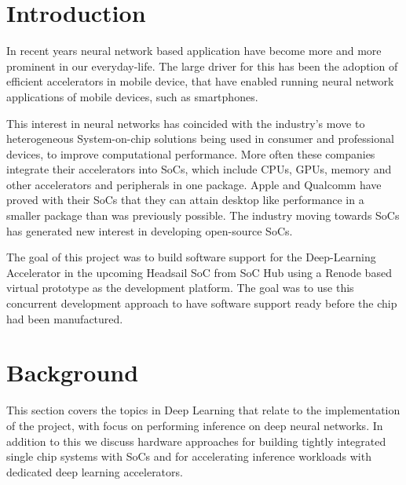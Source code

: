 \documentclass[12pt,a4paper,english
]{tunithesis}
\begin{document}
\thispagestyle{empty}
\listoffigures
\listoftables
\clearpage


\setcounter{tocdepth}{3}              %
\tableofcontents                      %

\if@twoside
\cleardoublepage
\fi


\renewcommand{\chaptername}{} %


\chapter{Introduction}
\label{ch:introduction}
\setcounter{page}{1} %

In recent years neural network based application have become more and more prominent in our everyday-life. The large driver for this has been the adoption of efficient accelerators in mobile device, that have enabled running neural network applications of mobile devices, such as smartphones.

This interest in neural networks has coincided with the industry's move to heterogeneous System-on-chip solutions being used in consumer and professional devices, to improve computational performance.
More often these companies integrate their accelerators into SoCs, which include CPUs, GPUs, memory and other accelerators and peripherals in one package. Apple and Qualcomm have proved with their SoCs that they can attain desktop like performance in a smaller package than was previously possible. The industry moving towards SoCs has generated new interest in developing open-source SoCs.

The goal of this project was to build software support for the Deep-Learning Accelerator in the upcoming Headsail SoC from SoC Hub using a Renode based virtual prototype as the development platform. The goal was to use this concurrent development approach to have software support ready before the chip had been manufactured.

\chapter{Background}
This section covers the topics in Deep Learning that relate to the implementation of the project, with focus on performing inference on deep neural networks. In addition to this we discuss hardware approaches for building tightly integrated single chip systems with SoCs and for accelerating inference workloads with dedicated deep learning accelerators.
\label{ch:background}
\end{document}

